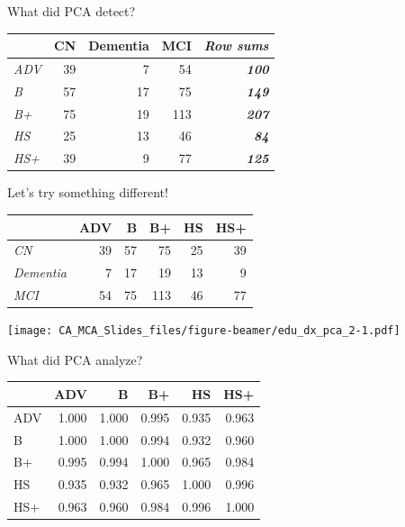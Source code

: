 \documentclass[
  ignorenonframetext,
]{beamer}
\begin{document}
\begin{frame}{What did PCA detect?}
\protect\hypertarget{what-did-pca-detect}{}

\begin{table}[H]
\centering
\begin{tabular}{>{\em}lrrr>{\bfseries\em}r}
\toprule
  & CN & Dementia & MCI & Row sums\\
\midrule
ADV & 39 & 7 & 54 & 100\\
B & 57 & 17 & 75 & 149\\
B+ & 75 & 19 & 113 & 207\\
HS & 25 & 13 & 46 & 84\\
HS+ & 39 & 9 & 77 & 125\\
\bottomrule
\end{tabular}
\end{table}

\end{frame}

\begin{frame}{Let's try something different!}
\protect\hypertarget{lets-try-something-different}{}

\begin{table}[H]
\centering
\begin{tabular}{>{\em}lrrrrr}
\toprule
  & ADV & B & B+ & HS & HS+\\
\midrule
CN & 39 & 57 & 75 & 25 & 39\\
Dementia & 7 & 17 & 19 & 13 & 9\\
MCI & 54 & 75 & 113 & 46 & 77\\
\bottomrule
\end{tabular}
\end{table}

\end{frame}

\begin{frame}

\texttt{[image: CA\_MCA\_Slides\_files/figure-beamer/edu\_dx\_pca\_2-1.pdf]}

\end{frame}

\begin{frame}{What did PCA analyze?}
\protect\hypertarget{what-did-pca-analyze}{}

\begin{table}[H]
\centering
\begin{tabular}{lrrrrr}
\toprule
  & ADV & B & B+ & HS & HS+\\
\midrule
ADV & 1.000 & 1.000 & 0.995 & 0.935 & 0.963\\
B & 1.000 & 1.000 & 0.994 & 0.932 & 0.960\\
B+ & 0.995 & 0.994 & 1.000 & 0.965 & 0.984\\
HS & 0.935 & 0.932 & 0.965 & 1.000 & 0.996\\
HS+ & 0.963 & 0.960 & 0.984 & 0.996 & 1.000\\
\bottomrule
\end{tabular}
\end{table}

\end{frame}
\end{document}
